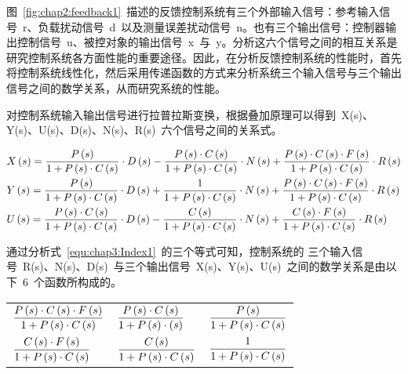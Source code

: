图~\ref{fig:chap2:feedback1}~描述的反馈控制系统有三个外部输入信号：参考输入信号~r、负载扰动信号~d~以及测量误差扰动信号~n。也有三个输出信号：控制器输出控制信号~u、被控对象的输出信号~x~与~y。分析这六个信号之间的相互关系是研究控制系统各方面性能的重要途径。因此，在分析反馈控制系统的性能时，首先将控制系统线性化，然后采用传递函数的方式来分析系统三个输入信号与三个输出信号之间的数学关系，从而研究系统的性能。

对控制系统输入输出信号进行拉普拉斯变换，根据叠加原理可以得到~X(s)、Y(s)、U(s)、D(s)、N(s)、R(s)~六个信号之间的关系式。

\begin{footnotesize}
\begin{equation}\label{equ:chap3:Index1}
\begin{aligned}
   &   X\left(s\right)=\displaystyle\frac{P\left(s\right)}{1+P\left(s\right)\cdot C\left(s\right)}\cdot D\left(s\right)-\displaystyle\frac{P\left(s\right)\cdot C\left(s\right) }{1+P\left(s\right)\cdot C\left(s\right)}\cdot N\left(s\right)+\displaystyle\frac{P\left(s\right)\cdot C\left(s\right)\cdot F\left(s\right) }{1+P\left(s\right)\cdot C\left(s\right)}\cdot R\left(s\right) \\
   &   Y\left(s\right)=\displaystyle\frac{P\left(s\right)}{1+P\left(s\right)\cdot C\left(s\right)}\cdot D\left(s\right)+\displaystyle\frac{1}{1+P\left(s\right)\cdot C\left(s\right)}\cdot N\left(s\right)+\displaystyle\frac{P\left(s\right)\cdot C\left(s\right)\cdot F\left(s\right) }{1+P\left(s\right)\cdot C\left(s\right)}\cdot R\left(s\right) \\
   &   U\left(s\right)=\displaystyle\frac{P\left(s\right)\cdot C\left(s\right)}{1+P\left(s\right)\cdot C\left(s\right)}\cdot D\left(s\right)-\displaystyle\frac{C\left(s\right)}{1+P\left(s\right)\cdot C\left(s\right)}\cdot N\left(s\right)+\displaystyle\frac{C\left(s\right)\cdot F\left(s\right) }{1+P\left(s\right)\cdot C\left(s\right)}\cdot R\left(s\right) \\
\end{aligned}
\end{equation}
\end{footnotesize}

通过分析式~\ref{equ:chap3:Index1}~的三个等式可知，控制系统的 三个输入信号~R(s)、N(s)、D(s)~与三个输出信号~X(s)、Y(s)、U(s)~之间的数学关系是由以下~6~个函数所构成的。

\begin{table}[htbp]
\centering
\renewcommand\arraystretch{2}                                %
      \begin{tabular}{C{3cm}C{3cm}C{3cm}}
                   $\displaystyle\frac{P\left(s\right)\cdot C\left(s\right)\cdot F\left(s\right)}{1+P\left(s\right)\cdot C\left(s\right)}$
               & $\displaystyle\frac{P\left(s\right)\cdot C\left(s\right)}{1+P\left(s\right)\cdot \left(s\right)}$
               &$\displaystyle\frac{P\left(s\right)}{1+P\left(s\right)\cdot C\left(s\right)}$\\

                   $\displaystyle\frac{C\left(s\right)\cdot F\left(s\right)}{1+P\left(s\right)\cdot C\left(s\right)}$
               & $\displaystyle\frac{C\left(s\right)}{1+P\left(s\right)\cdot C\left(s\right)}$
               & $\displaystyle\frac{1}{1+P\left(s\right)\cdot C\left(s\right)}$
\end{tabular}
\end{table}

